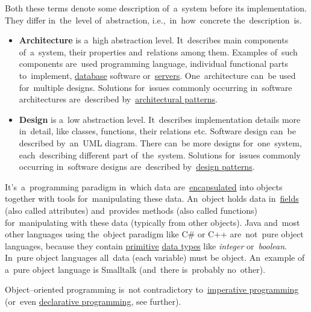 \label{architecturedesign}
Both these terms denote some description of~a~system before its implementation. They differ in~the~level of~abstraction, i.e.,~in~how~concrete the~description~is.
\begin{itemize}
    \item \textbf{Architecture} is a~high abstraction level. It~describes main components of~a~system, their properties and~relations among them. Examples of~such components are~used programming language, individual functional parts to~implement, \hyperref[databases]{database} software or~\hyperref[server]{servers}. One~architecture can~be used for~multiple designs. Solutions for~issues commonly occurring in~software architectures are~described by~\hyperref[architecturalpatterns]{architectural patterns}.
    \item \textbf{Design} is a~low abstraction level. It~describes implementation details more in~detail, like classes, functions, their relations etc. Software design can~be described by~an~UML diagram. There can~be more designs for~one~system, each~describing different part of~the~system. Solutions for~issues commonly occurring in~software designs are~described by~\hyperref[designpatterns]{design patterns}.
\end{itemize}

\label{objectorientedprogramming}
It's~a~programming paradigm in~which data are~\hyperref[encapsulation]{encapsulated} into objects together with tools for~manipulating these data. An~object holds data in~\hyperref[variablefieldproperty]{fields} (also called attributes) and~provides methods (also called functions) for~manipulating with these data (typically from other objects). Java and~most other languages using the~object paradigm like C\# or C++ are~not~pure object languages, because they contain \hyperref[javadatatypes]{primitive} \hyperref[datatypes]{data types} like \textit{integer} or~\textit{boolean}. In~pure object languages all~data (each variable) must be object. An~example of a~pure object language is Smalltalk (and~there is~probably no~other).

\warning Object--oriented programming is~not contradictory to~\hyperref[imperativeprogramming]{imperative programming} (or~even \hyperref[declarativeprogramming]{declarative programming}, see further).


